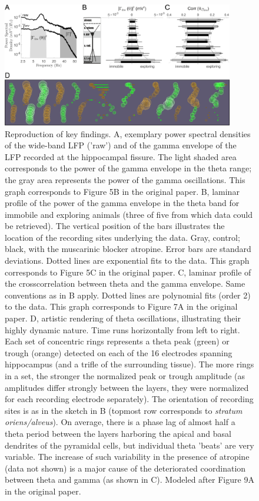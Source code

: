 \begin{figure}
	\centering
	\includegraphics[width=0.9\textwidth]{figures/figures_tenYears_02.png}
	\caption{Reproduction of key findings. A, exemplary power spectral densities of the wide-band LFP ('raw') and of the gamma envelope of the LFP recorded at the hippocampal fissure. The light shaded area corresponds to the power of the gamma envelope in the theta range; the gray area represents the power of the gamma oscillations. This graph corresponds to Figure 5B in the original paper. B, laminar profile of the power of the gamma envelope in the theta band for immobile and exploring  animals (three of five from which data could be retrieved). The vertical position of the bars illustrates the location of the recording sites underlying the data. Gray, control; black, with the muscarinic blocker atropine. Error bars are standard deviations. Dotted lines are exponential fits to the data. This graph corresponds to Figure 5C in the original paper. C, laminar profile of the crosscorrelation between theta and the gamma envelope. Same conventions as in B apply. Dotted lines are polynomial fits (order 2) to the data. This graph corresponds to Figure 7A in the original paper. D, artistic rendering of theta oscillations, illustrating their highly dynamic nature. Time runs horizontally from left to right. Each set of concentric rings represents a theta peak (green) or trough (orange) detected on each of the 16 electrodes spanning hippocampus (and a trifle of the surrounding tissue). The more rings in a set, the stronger the normalized peak or trough amplitude (as amplitudes differ strongly between the layers, they were normalized for each recording electrode separately). The orientation of recording sites is as in the sketch in B (topmost row corresponds to \textit{stratum oriens/alveus}). On average, there is a phase lag of almost half a theta period between the layers harboring the apical and basal dendrites of the pyramidal cells, but individual theta 'beats' are very variable. The increase of such variability in the presence of atropine (data not shown) is a major cause of the deteriorated coordination between theta and gamma (as shown in C). Modeled after Figure 9A in the original paper.}
	\label{fig:repro}
\end{figure}



